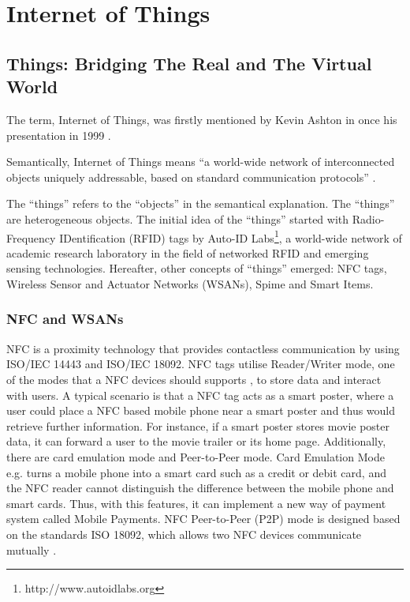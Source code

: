 \chapter{Internet of Things}
\label{chapter:internetofthings} 

\section{Things: Bridging The Real and The Virtual World}

The term, Internet of Things, was firstly mentioned by Kevin Ashton in once his presentation in 1999 \cite{ashton2009internet}.

Semantically, Internet of Things means ``a world-wide network of interconnected objects uniquely addressable, based on standard communication protocols'' \cite{infso2008networked}. 

The ``things'' refers to the ``objects'' in the semantical explanation. The ``things'' are heterogeneous objects. The initial idea of the ``things'' started with Radio-Frequency IDentification (RFID) tags by Auto-ID Labs\footnote{http://www.autoidlabs.org}, a world-wide network of academic research laboratory in the field of networked RFID and emerging sensing technologies. Hereafter, other concepts of ``things'' emerged: NFC tags, Wireless Sensor and Actuator Networks (WSANs), Spime and Smart Items.

\subsection{NFC and WSANs}

NFC is a proximity technology that provides contactless communication by using ISO/IEC 14443 and ISO/IEC 18092. NFC tags utilise Reader/Writer mode, one of the modes that a NFC devices should supports \cite{Madlmayr:SecurityandPrivacy}, to store data and interact with users. A typical scenario is that a NFC tag acts as a smart poster, where a user could place a NFC based mobile phone near a smart poster and thus would retrieve further information. For instance, if a smart poster stores movie poster data, it can forward a user to the movie trailer or its home page. Additionally, there are card emulation mode and Peer-to-Peer mode. Card Emulation Mode e.g. turns a mobile phone into a smart card such as a credit or debit card, and the NFC reader cannot distinguish the difference between the mobile phone and smart cards. Thus, with this features, it can implement a new way of payment system called Mobile Payments. NFC Peer-to-Peer (P2P) mode is designed based on the standards ISO 18092, which allows two NFC devices communicate mutually \cite{Madlmayr:SecurityandPrivacy}.

